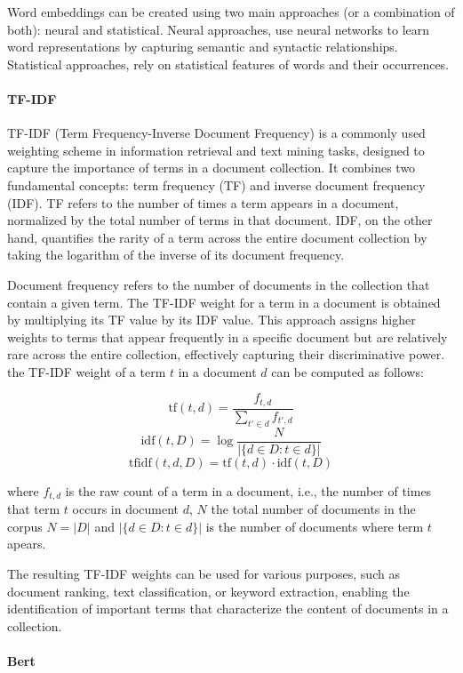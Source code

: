 \documentclass[a4paper,12pt]{article}
\begin{document}
Word embeddings can be created using two main approaches (or a combination of both): neural and statistical. 
Neural approaches, use neural networks to learn word representations by capturing semantic and syntactic relationships. Statistical approaches, rely on statistical features of words and their occurrences.

\paragraph{TF-IDF}
TF-IDF (Term Frequency-Inverse Document Frequency) is a commonly used weighting scheme in information retrieval and text mining tasks, designed to capture the importance of terms in a document collection. It combines two fundamental concepts: term frequency (TF) and inverse document frequency (IDF). TF refers to the number of times a term appears in a document, normalized by the total number of terms in that document. IDF, on the other hand, quantifies the rarity of a term across the entire document collection by taking the logarithm of the inverse of its document frequency. 

Document frequency refers to the number of documents in the collection that contain a given term. The TF-IDF weight for a term in a document is obtained by multiplying its TF value by its IDF value. This approach assigns higher weights to terms that appear frequently in a specific document but are relatively rare across the entire collection, effectively capturing their discriminative power. the TF-IDF weight of a term $t$ in a document $d$ can be computed as follows:

$${\displaystyle \mathrm {tf} (t,d)={\frac {f_{t,d}}{\sum _{t'\in d}{f_{t',d}}}}}$$
$$ \mathrm{idf}(t, D) =  \log \frac{N}{|\{d \in D: t \in d\}|}$$
$${\displaystyle \mathrm {tfidf} (t,d,D)=\mathrm {tf} (t,d)\cdot \mathrm {idf} (t,D)}$$


where $f_{t,d}$ is the raw count of a term in a document, i.e., the number of times that term $t$ occurs in document $d$,
$N$ the total number of documents in the corpus $N=|D|$ and  $|\{d \in D: t \in d\}|$ is the number of documents where term $t$ apears.

The resulting TF-IDF weights can be used for various purposes, such as document ranking, text classification, or keyword extraction, enabling the identification of important terms that characterize the content of documents in a collection.

\paragraph{Bert}
\end{document}
